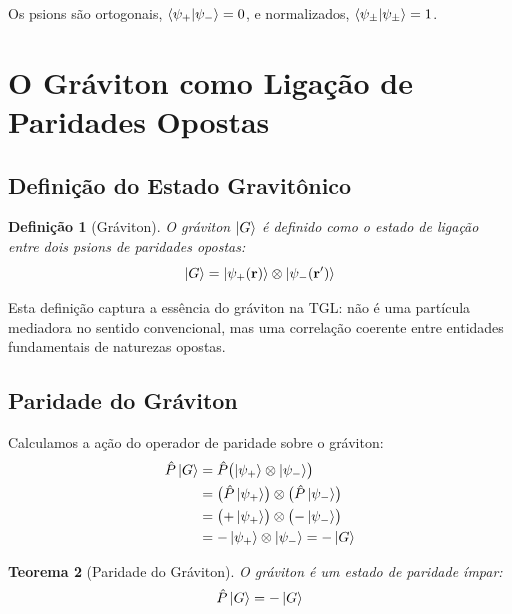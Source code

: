 \documentclass[12pt,a4paper,twoside]{article}
\newtheorem{theorem}{Teorema}[section]
\newtheorem{definition}[theorem]{Defini\c{c}\~ao}
\newcommand{\psion}{\psi}
\begin{document}
\noindent Os psions s\~ao ortogonais, $\braket{\psion_+}{\psion_-} = 0$, e normalizados, $\braket{\psion_\pm}{\psion_\pm} = 1$.


\section{O Gr\'aviton como Liga\c{c}\~ao de Paridades Opostas}


\subsection{Defini\c{c}\~ao do Estado Gravit\^onico}

\begin{definition}[Gr\'aviton]
O gr\'aviton $\ket{G}$ \'e definido como o estado de liga\c{c}\~ao entre dois psions de paridades opostas:
\begin{equation}
\ket{G} = \ket{\psion_+(\mathbf{r})} \otimes \ket{\psion_-(\mathbf{r}')}
\label{eq:graviton_def}
\end{equation}
\end{definition}

\noindent Esta defini\c{c}\~ao captura a ess\^encia do gr\'aviton na TGL: n\~ao \'e uma part\'icula mediadora no sentido convencional, mas uma correla\c{c}\~ao coerente entre entidades fundamentais de naturezas opostas.

\subsection{Paridade do Gr\'aviton}

Calculamos a a\c{c}\~ao do operador de paridade sobre o gr\'aviton:
\begin{align}
\hat{P}\ket{G} &= \hat{P}\bigl(\ket{\psion_+} \otimes \ket{\psion_-}\bigr) \notag \\
&= \bigl(\hat{P}\ket{\psion_+}\bigr) \otimes \bigl(\hat{P}\ket{\psion_-}\bigr) \notag \\
&= \bigl(+\ket{\psion_+}\bigr) \otimes \bigl(-\ket{\psion_-}\bigr) \notag \\
&= -\ket{\psion_+} \otimes \ket{\psion_-} = -\ket{G}
\label{eq:paridade_graviton}
\end{align}

\begin{resultbox}[title={Teorema 1 --- Paridade do Gr\'aviton}]
\begin{theorem}[Paridade do Gr\'aviton]\label{thm:paridade}
O gr\'aviton \'e um estado de paridade \'impar:
\begin{equation}
\hat{P}\ket{G} = -\ket{G}
\end{equation}
\end{theorem}
\end{resultbox}
\end{document}
